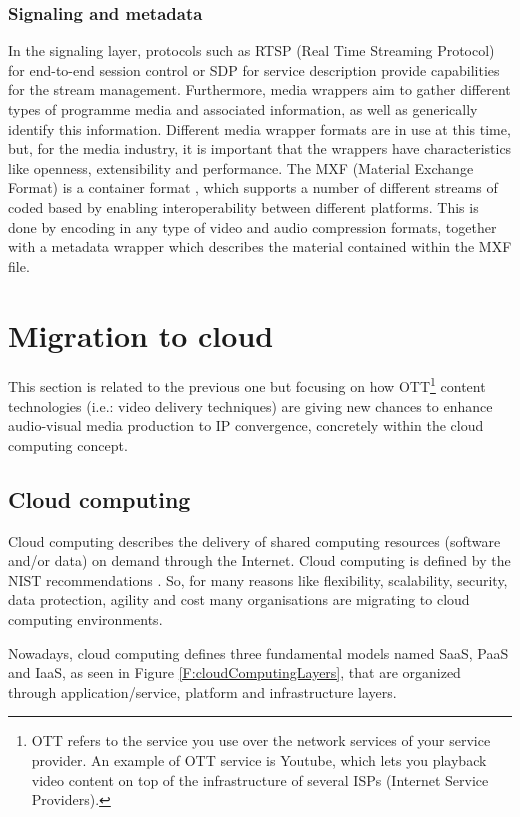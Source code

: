 \subsubsection{Signaling and metadata}

In the signaling layer, protocols such as RTSP (Real Time Streaming Protocol) for end-to-end session control or SDP for service description provide capabilities for the stream management. Furthermore, media wrappers aim to gather different types of programme media and associated information, as well as generically identify this information. Different media wrapper formats are in use at this time, but, for the media industry, it is important that the wrappers have characteristics like openness, extensibility and performance. The MXF (Material Exchange Format) is a container format \cite{mxf}, which supports a number of different streams of coded based by enabling interoperability between different platforms. This is done by encoding in any type of video and audio compression formats, together with a metadata wrapper which describes the material contained within the MXF file. 

\section{Migration to cloud}

This section is related to the previous one but focusing on how OTT\footnote{OTT refers to the service you use over the network services of your service provider. An example of OTT service is Youtube, which lets you playback video content on top of the infrastructure of several ISPs (Internet Service Providers).} \cite{ottVSiptv} content technologies (i.e.: video delivery techniques) are giving new chances to enhance audio-visual media production to IP convergence, concretely within the cloud computing concept. 

\subsection{Cloud computing}

Cloud computing describes the delivery of shared computing resources (software and/or data) on demand through the Internet. Cloud computing is defined by the NIST recommendations \cite{nistcc}. So, for many reasons like flexibility, scalability, security, data protection, agility and cost many organisations are migrating to cloud computing environments. 

Nowadays, cloud computing defines three fundamental models named SaaS, PaaS and IaaS, as seen in Figure \ref{F:cloudComputingLayers}, that are organized through application/service, platform and infrastructure layers.

